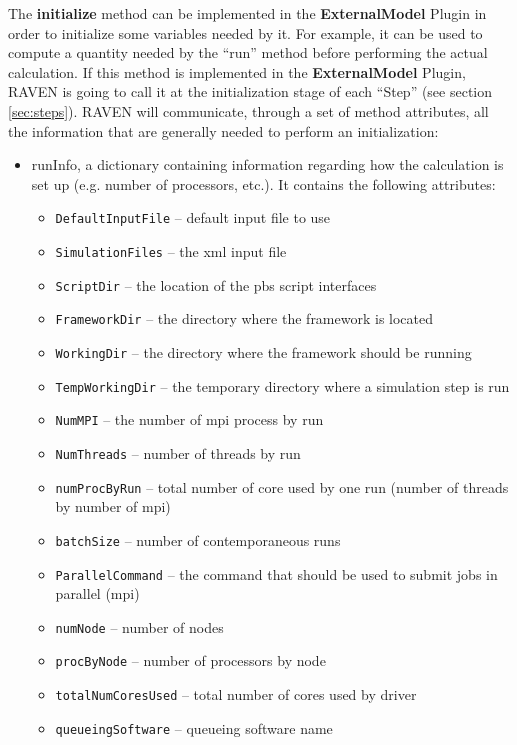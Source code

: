 The \textbf{initialize} method can be implemented in the \textbf{ExternalModel} Plugin
in order to initialize some variables needed by it.
%
For example, it can be used to compute a quantity needed by the ``run'' method
before performing the actual calculation.
%
If this method is implemented in the \textbf{ExternalModel} Plugin, RAVEN is going to
call it at the initialization stage of each ``Step'' (see section \ref{sec:steps}).
%
RAVEN will communicate, through a set of method attributes, all the information
that are generally needed to perform an initialization:
\begin{itemize}
  \item runInfo, a dictionary containing information regarding how the
  calculation is set up (e.g. number of processors, etc.).
  It contains the following attributes:
  \begin{itemize}
    \item \texttt{DefaultInputFile} -- default input file to use
    \item \texttt{SimulationFiles} -- the xml input file
    \item \texttt{ScriptDir} -- the location of the pbs script interfaces
    \item \texttt{FrameworkDir} -- the directory where the framework is located
    \item \texttt{WorkingDir} -- the directory where the framework should be
    running
    \item \texttt{TempWorkingDir} -- the temporary directory where a simulation
    step is run
    \item \texttt{NumMPI} -- the number of mpi process by run
    \item \texttt{NumThreads} -- number of threads by run
    \item \texttt{numProcByRun} -- total number of core used by one run (number
    of threads by number of mpi)
    \item \texttt{batchSize} -- number of contemporaneous runs
    \item \texttt{ParallelCommand} -- the command that should be used to submit
    jobs in parallel (mpi)
    \item \texttt{numNode} -- number of nodes
    \item \texttt{procByNode} -- number of processors by node
    \item \texttt{totalNumCoresUsed} -- total number of cores used by driver
    \item \texttt{queueingSoftware} -- queueing software name

\end{itemize}
\end{itemize}
